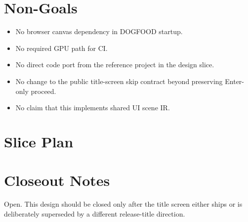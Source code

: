 \section{Non-Goals}\label{record-114-non-goals}

\begin{itemize}
\tightlist
\item
  No browser canvas dependency in DOGFOOD startup.
\item
  No required GPU path for CI.
\item
  No direct code port from the reference project in the design slice.
\item
  No change to the public title-screen skip contract beyond preserving Enter-only proceed.
\item
  No claim that this implements shared UI scene IR.
\end{itemize}

\section{Slice Plan}\label{record-114-slice-plan}



\section{Closeout Notes}\label{record-114-closeout-notes}

Open. This design should be closed only after the title screen either ships or is deliberately superseded by a different release-title direction.

